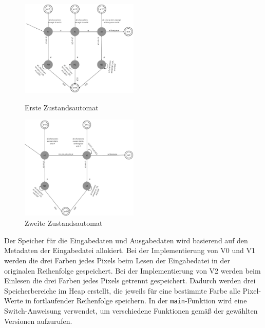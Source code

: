 \documentclass[course=erap]{aspdoc}
\begin{document}
\begin{figure}[h]
    \centering
    \includegraphics[width=0.5\textwidth]{Bilder/auto1.png}
    \caption{Erste Zustandsautomat}
    \includegraphics[width=0.5\textwidth]{Bilder/auto2.png} 
    \caption{Zweite Zustandsautomat} 
\end{figure}
\par
Der Speicher für die Eingabedaten und Ausgabedaten wird basierend auf den Metadaten der Eingabedatei allokiert. Bei der Implementierung von V0 und V1 werden die drei Farben jedes Pixels beim Lesen der Eingabedatei in der originalen Reihenfolge gespeichert. Bei der Implementierung von V2 werden beim Einlesen die drei Farben jedes Pixels getrennt gespeichert. Dadurch werden drei Speicherbereiche im Heap erstellt, die jeweils für eine bestimmte Farbe alle Pixel-Werte in fortlaufender Reihenfolge speichern. In der \texttt{main}-Funktion wird eine Switch-Anweisung verwendet, um verschiedene Funktionen gemäß der gewählten Versionen aufzurufen.
\end{document}
